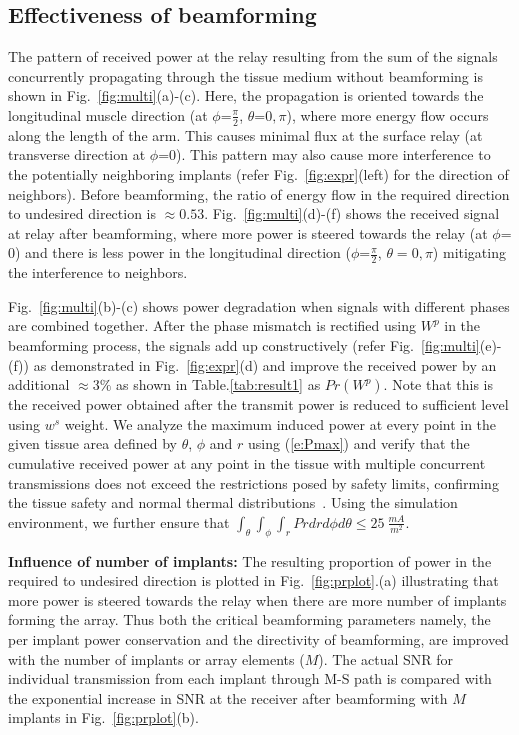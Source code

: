 \subsection{Effectiveness of beamforming} The pattern of received power at the relay resulting from the sum of the signals concurrently propagating through the tissue medium without beamforming is shown in
Fig.~\ref{fig:multi}(a)-(c). Here, the propagation is oriented towards the longitudinal muscle direction (at $\phi$=$\frac{\pi}{2}$, $\theta$=$0,\pi$), where more energy flow occurs along the length of the arm. This causes minimal flux at the surface relay (at transverse direction at $\phi$=$0$). This pattern may also cause more interference to the potentially neighboring implants (refer Fig.~\ref{fig:expr}(left) for the direction of neighbors). Before beamforming, the ratio of energy flow in the required direction to undesired direction is $\approx 0.53$. Fig.~\ref{fig:multi}(d)-(f) shows the received signal at relay after beamforming, where more power is steered towards the relay (at $\phi$=$0$) and there is less power in the longitudinal direction ($\phi$=$\frac{\pi}{2}$, $\theta=0,\pi$) mitigating the interference to neighbors. 

Fig.~\ref{fig:multi}(b)-(c) shows power degradation when signals with different phases are combined together. After the phase mismatch is rectified using $W^p$ in the beamforming process, the signals add up constructively (refer Fig.~\ref{fig:multi}(e)-(f)) as demonstrated in Fig.~\ref{fig:expr}(d) and improve the received power by an additional $\approx 3\%$ as shown in Table.\ref{tab:result1} as $Pr(W^p)$. Note that this is the received power obtained after the transmit power is reduced to sufficient level using $w^s$ weight.
 We analyze the maximum induced power at every point in the given tissue area defined by $\theta$, $\phi$ and $r$ using (\ref{e:Pmax}) and verify that the cumulative received power at any point in the tissue with multiple concurrent transmissions does not exceed the restrictions posed by safety limits, confirming the tissue safety and normal thermal distributions~\cite{ICNIRP}. Using the simulation environment, we further ensure that $\int_{\theta} \int_{\phi} \int_{r} Pr dr d\phi d\theta \leq 25\ \frac{mA}{m^2}$. 

\noindent \textbf{Influence of number of implants:}
The resulting proportion of power in the required to undesired direction is plotted in Fig.~\ref{fig:prplot}.(a) illustrating that more power is steered towards the relay when there are more number of implants forming the array. Thus both the critical beamforming parameters namely, the per implant power conservation and the directivity of beamforming, are improved with the number of implants or array elements ($M$). The actual SNR for individual transmission from each implant through M-S path is compared with the exponential increase in SNR at the receiver after beamforming with $M$ implants in Fig.~\ref{fig:prplot}(b). 


